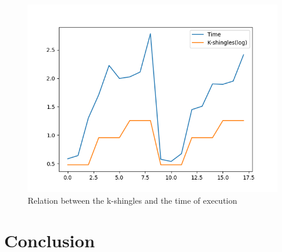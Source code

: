 \documentclass[12pt]{article}
\begin{document}
\begin{figure}[h]
\includegraphics[scale=1]{JaccardSimilarity_KShinglesTime.png}
  \caption{Relation between the k-shingles and the time of execution}
  \label{fig:KShinglesSimilarity}
\end{figure}



\section{Conclusion}


\newpage
\end{document}
